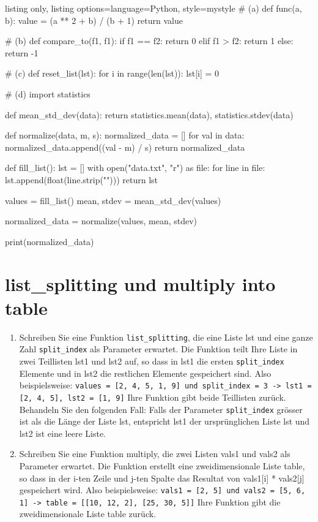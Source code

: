 \documentclass[11pt, oneside]{book}
\begin{document}
\begin{tcblisting}{listing only, listing options={language=Python, style=mystyle}}
# (a)
def func(a, b):
    value = (a ** 2 + b) / (b + 1)
    return value

# (b)
def compare_to(f1, f1):
    if f1 == f2:
        return 0
    elif f1 > f2:
        return 1
    else:
        return -1
    
# (c)
def reset_list(lst):
    for i in range(len(lst)):
        lst[i] = 0

# (d)
import statistics

def mean_std_dev(data):
    return statistics.mean(data), statistics.stdev(data)

def normalize(data, m, s):
    normalized_data = []
    for val in data:
        normalized_data.append((val - m) / s)
    return normalized_data

def fill_list():
    lst = []
    with open("data.txt", "r") as file:
        for line in file:
            lst.append(float(line.strip("\n")))
    return lst

values = fill_list()
mean, stdev = mean_std_dev(values)

normalized_data = normalize(values, mean, stdev)

print(normalized_data)
\end{tcblisting}

\newpage
\section{list\_splitting und multiply into table}

\begin{enumerate}[label=(\alph*)]
    \item Schreiben Sie eine Funktion \texttt{list\_splitting}, die eine Liste lst und eine ganze Zahl \texttt{split\_index} als Parameter erwartet. Die Funktion teilt Ihre Liste in zwei Teillisten lst1 und lst2 auf, so dass in lst1 die ersten \texttt{split\_index} Elemente und in lst2 die restlichen Elemente gespeichert sind. Also beispielsweise: \newline
    \texttt{values = [2, 4, 5, 1, 9] und split\_index = 3 \newline
    -> lst1 = [2, 4, 5], lst2 = [1, 9]} \newline
    Ihre Funktion gibt beide Teillisten zur\"uck. Behandeln Sie den folgenden Fall: Falls der Parameter \texttt{split\_index} grösser ist als die Länge der Liste lst, entspricht lst1 der urspr\"unglichen Liste lst und lst2 ist eine leere Liste.
    \item Schreiben Sie eine Funktion multiply, die zwei Listen vals1 und vals2 als Parameter erwartet. Die Funktion erstellt eine zweidimensionale Liste table, so dass in der i-ten Zeile und j-ten Spalte das Resultat von vals1[i] * vals2[j] gespeichert wird. Also beispielsweise: \newline
    \texttt{vals1 = [2, 5] und vals2 = [5, 6, 1] \newline
    -> table = [[10, 12, 2], [25, 30, 5]]} \newline
    Ihre Funktion gibt die zweidimensionale Liste table zur\"uck.
\end{enumerate}
\end{document}
